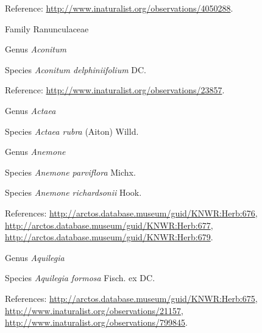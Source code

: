 \documentclass[9pt, article]{memoir}
\begin{document}
\begin{multicols}{2}
\vspace{6pt}Reference: 
\url{http://www.inaturalist.org/observations/4050288}.

\vspace{6pt}\noindent\hspace{24pt}Family Ranunculaceae


\vspace{6pt}\noindent\hspace{30pt}Genus \textit{Aconitum}


\vspace{6pt}\noindent\hspace{36pt}Species \textit{Aconitum delphiniifolium} DC.


\vspace{6pt}Reference: 
\url{http://www.inaturalist.org/observations/23857}.

\vspace{6pt}\noindent\hspace{30pt}Genus \textit{Actaea}


\vspace{6pt}\noindent\hspace{36pt}Species \textit{Actaea rubra} (Aiton) Willd.


\vspace{6pt}\noindent\hspace{30pt}Genus \textit{Anemone}


\vspace{6pt}\noindent\hspace{36pt}Species \textit{Anemone parviflora} Michx.


\vspace{6pt}\noindent\hspace{36pt}Species \textit{Anemone richardsonii} Hook.


\vspace{6pt}References: 
\url{http://arctos.database.museum/guid/KNWR:Herb:676}, 
\url{http://arctos.database.museum/guid/KNWR:Herb:677}, 
\url{http://arctos.database.museum/guid/KNWR:Herb:679}.

\vspace{6pt}\noindent\hspace{30pt}Genus \textit{Aquilegia}


\vspace{6pt}\noindent\hspace{36pt}Species \textit{Aquilegia formosa} Fisch. ex DC.


\vspace{6pt}References: 
\url{http://arctos.database.museum/guid/KNWR:Herb:675}, 
\url{http://www.inaturalist.org/observations/21157}, 
\url{http://www.inaturalist.org/observations/799845}.


\end{multicols}
\end{document}
